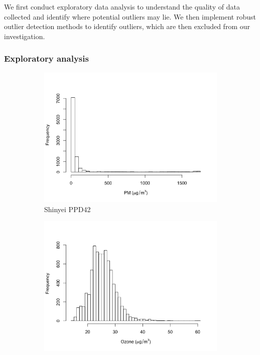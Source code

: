 \documentclass[11pt]{report}
\begin{document}
We first conduct exploratory data analysis to understand the quality of data collected and identify where potential outliers may lie. We then implement robust outlier detection methods to identify outliers, which are then excluded from our investigation.

\subsubsection{Exploratory analysis}

\begin{figure}[!tbp]
    \centering
    \begin{minipage}{1\linewidth}
            \begin{subfigure}[t]{.5\linewidth}
                \includegraphics[width=\textwidth]{images/pm_histogram}
                \caption{Shinyei PPD42}
                \label{fig:pm_histogram}
            \end{subfigure}
            \begin{subfigure}[t]{.5\linewidth}
            	\includegraphics[width=\textwidth]{images/ozone_histogram}

\end{subfigure}
\end{minipage}
\end{figure}
\end{document}
